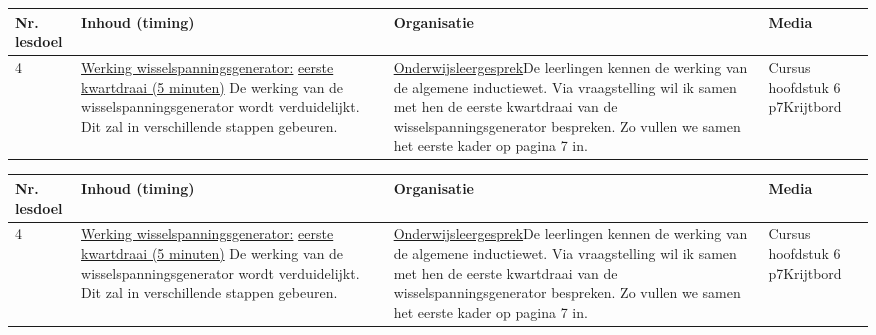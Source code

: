 \begin{landscape}
\begin{tabularx}{1.56\textwidth}{|p{1.5cm}|p{9cm}|X|p{4cm}|}
	\hline
	\textbf{Nr. lesdoel } & \textbf{Inhoud (timing)}  & \textbf{Organisatie } & \textbf{Media } \\ \hline
	4& \underline{Werking wisselspanningsgenerator:} \underline{eerste kwartdraai (5 minuten)}\newline
	De werking van de wisselspanningsgenerator wordt verduidelijkt. Dit zal in verschillende stappen gebeuren.
	&  \underline{Onderwijsleergesprek}\newline  De leerlingen kennen de werking van de algemene inductiewet. Via vraagstelling wil ik samen met hen de eerste kwartdraai van de wisselspanningsgenerator bespreken. Zo vullen we samen het eerste kader op pagina 7 in.
	&  Cursus hoofdstuk 6 p7\newline\newline Krijtbord
	\\ \hline
\end{tabularx}\vspace{5mm}


\begin{tabularx}{1.56\textwidth}{|p{1.5cm}|p{9cm}|X|p{4cm}|}
\hline
\textbf{Nr. lesdoel } & \textbf{Inhoud (timing)}  & \textbf{Organisatie } & \textbf{Media } \\ \hline
4& \underline{Werking wisselspanningsgenerator:} \underline{eerste kwartdraai (5 minuten)}\newline
De werking van de wisselspanningsgenerator wordt verduidelijkt. Dit zal in verschillende stappen gebeuren.
&  \underline{Onderwijsleergesprek}\newline  De leerlingen kennen de werking van de algemene inductiewet. Via vraagstelling wil ik samen met hen de eerste kwartdraai van de wisselspanningsgenerator bespreken. Zo vullen we samen het eerste kader op pagina 7 in.
&  Cursus hoofdstuk 6 p7\newline\newline Krijtbord
\\ \hline
\end{tabularx}\vspace{5mm}




\end{landscape}
